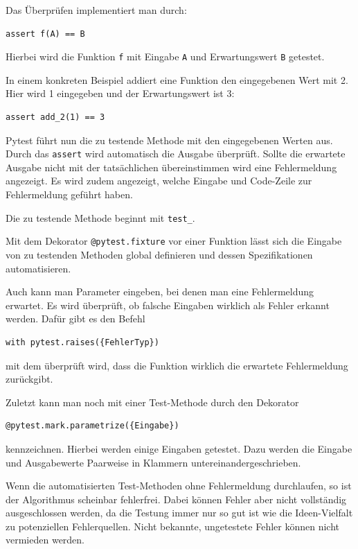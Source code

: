 \documentclass[]{dsadokumentation}
\begin{document}
Das Überprüfen implementiert man durch:

\begin{verbatim}
assert f(A) == B
\end{verbatim}

Hierbei wird die Funktion \texttt{f} mit Eingabe \texttt{A} und Erwartungswert \texttt{B} getestet. 

In einem konkreten Beispiel addiert eine Funktion den eingegebenen Wert mit 2. Hier wird 1 eingegeben und der Erwartungswert ist 3:

\begin{verbatim}
assert add_2(1) == 3
\end{verbatim}

Pytest führt nun die zu testende Methode mit den eingegebenen Werten aus. Durch das \texttt{assert} wird automatisch die Ausgabe überprüft. Sollte die erwartete Ausgabe nicht mit der tatsächlichen übereinstimmen wird eine Fehlermeldung angezeigt. Es wird zudem angezeigt, welche Eingabe und Code-Zeile zur Fehlermeldung geführt haben.

Die zu testende Methode beginnt mit \texttt{test\_}.

Mit dem Dekorator \texttt{@pytest.fixture} vor einer Funktion lässt sich die Eingabe von zu testenden Methoden global definieren und dessen Spezifikationen automatisieren.

Auch kann man Parameter eingeben, bei denen man eine Fehlermeldung erwartet. Es wird überprüft, ob falsche Eingaben wirklich als Fehler erkannt werden. Dafür gibt es den Befehl

\begin{verbatim}
with pytest.raises({FehlerTyp})
\end{verbatim}

mit dem überprüft wird, dass die Funktion wirklich die erwartete Fehlermeldung zurückgibt.

Zuletzt kann man noch mit einer Test-Methode durch den Dekorator

\begin{verbatim}
@pytest.mark.parametrize({Eingabe})
\end{verbatim}

kennzeichnen. Hierbei werden einige Eingaben getestet. Dazu werden die Eingabe und Ausgabewerte Paarweise in Klammern untereinandergeschrieben.

Wenn die automatisierten Test-Methoden ohne Fehlermeldung durchlaufen, so ist der Algorithmus scheinbar fehlerfrei. Dabei können Fehler aber nicht vollständig ausgeschlossen werden, da die Testung immer nur so gut ist wie die Ideen-Vielfalt zu potenziellen Fehlerquellen. Nicht bekannte, ungetestete Fehler können nicht vermieden werden.
\end{document}
